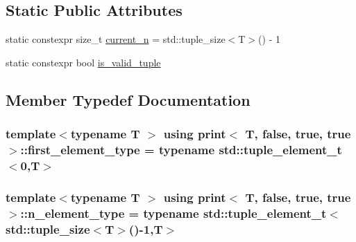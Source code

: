 \subsection*{Static Public Attributes}
\begin{DoxyCompactItemize}
\item 
static constexpr size\+\_\+t \hyperlink{structprint_3_01T_00_01false_00_01true_00_01true_01_4_a1b88695798454d00772ed00dde4f10b8}{current\+\_\+n} = std\+::tuple\+\_\+size$<$T$>$() -\/ 1
\item 
static constexpr bool \hyperlink{structprint_3_01T_00_01false_00_01true_00_01true_01_4_ac26cb1e1f2d4e622fc9bd7ba97555dc4}{is\+\_\+valid\+\_\+tuple}
\end{DoxyCompactItemize}


\subsection{Member Typedef Documentation}
\subsubsection[{\texorpdfstring{first\+\_\+element\+\_\+type}{first_element_type}}]{\setlength{\rightskip}{0pt plus 5cm}template$<$typename T $>$ using {\bf print}$<$ T, false, true, true $>$\+::{\bf first\+\_\+element\+\_\+type} =  typename std\+::tuple\+\_\+element\+\_\+t$<$0,T$>$}\hypertarget{structprint_3_01T_00_01false_00_01true_00_01true_01_4_a2dae0d9d3db0a28ae73051bef2394aaa}{}\label{structprint_3_01T_00_01false_00_01true_00_01true_01_4_a2dae0d9d3db0a28ae73051bef2394aaa}
\subsubsection[{\texorpdfstring{n\+\_\+element\+\_\+type}{n_element_type}}]{\setlength{\rightskip}{0pt plus 5cm}template$<$typename T $>$ using {\bf print}$<$ T, false, true, true $>$\+::{\bf n\+\_\+element\+\_\+type} =  typename std\+::tuple\+\_\+element\+\_\+t$<$std\+::tuple\+\_\+size$<$T$>$()-\/1,T$>$}\hypertarget{structprint_3_01T_00_01false_00_01true_00_01true_01_4_a6b6bfb81869a40026880ebd0d82cd25a}{}\label{structprint_3_01T_00_01false_00_01true_00_01true_01_4_a6b6bfb81869a40026880ebd0d82cd25a}


